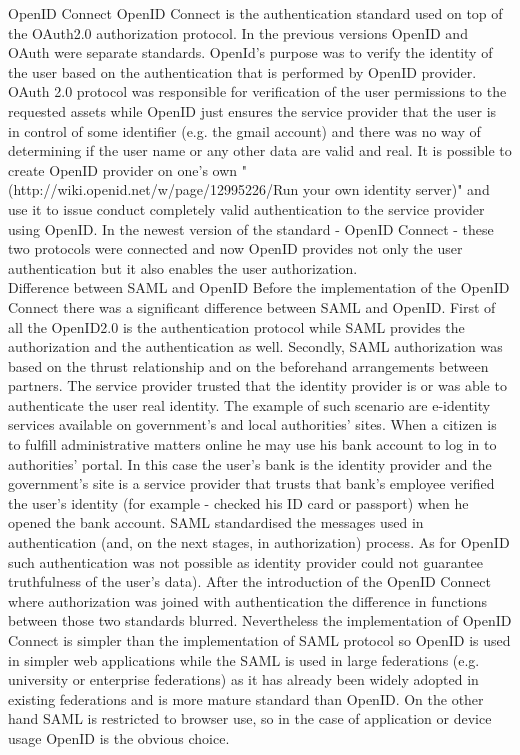 \documentclass[magisterska,en]{pracamgr}
\begin{document}
OpenID Connect
OpenID Connect is the authentication standard used on top of the OAuth2.0 authorization protocol. In the previous versions OpenID and OAuth were separate standards. OpenId's purpose was to verify the identity of the user based on the authentication that is performed by OpenID provider\cite{OpenID_old}. OAuth 2.0 protocol was responsible for verification of the user permissions to the requested assets\cite{OAuth2} while OpenID just ensures the service provider that the user is in control of some identifier (e.g. the gmail account) and there was no way of determining if the user name or any other data are valid and real. It is possible to create OpenID provider on one's own "(http://wiki.openid.net/w/page/12995226/Run your own identity server)" and use it to issue conduct completely valid authentication to the service provider using OpenID. In the newest version of the standard - OpenID Connect - these two protocols were connected and now OpenID provides not only the user authentication but it also enables the user authorization.\cite{OpenID}\\

Difference between SAML and OpenID
Before the implementation of the OpenID Connect there was a significant difference between SAML and OpenID. First of all the OpenID2.0 is the authentication protocol while SAML provides the authorization and the authentication as well. Secondly, SAML authorization was based on the thrust relationship and on the beforehand arrangements between partners. The service provider trusted that the identity provider is or was able to authenticate the user real identity. The example of such scenario are e-identity services available on government's and local authorities' sites. When a citizen is to fulfill administrative matters online he may use his bank account to log in to authorities' portal. In this case the user's bank is the identity provider and the government's site is a service provider that trusts that bank's employee verified the user's identity (for example - checked his ID card or passport) when he opened the bank account. SAML standardised the messages used in authentication (and, on the next stages, in authorization) process. As for OpenID such authentication was not possible as identity provider could not guarantee truthfulness of the user's data).
After the introduction of the OpenID Connect where authorization was joined with authentication the difference in functions between those two standards blurred. Nevertheless the implementation of OpenID Connect is simpler than the implementation of SAML protocol so OpenID is used in simpler web applications while the SAML is used in large federations (e.g. university or enterprise federations) as it has already been widely adopted in existing federations and is more mature standard than OpenID. On the other hand SAML is restricted to browser use, so in the case of application or device usage OpenID is the obvious choice.\cite{Ubisec_whitepaper}\\
\end{document}
